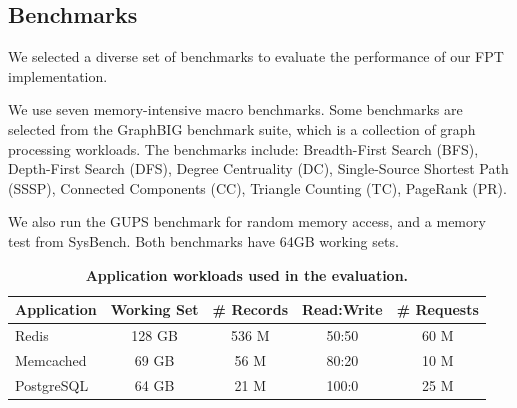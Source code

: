 \subsection{Benchmarks}

We selected a diverse set of benchmarks to evaluate the performance of our FPT implementation.

We use seven memory-intensive macro benchmarks. Some benchmarks are selected from the GraphBIG benchmark suite, which is a collection of graph processing workloads. The benchmarks include: 
    Breadth-First Search (BFS),
    Depth-First Search (DFS),
    Degree Centruality (DC),
    Single-Source Shortest Path (SSSP),
    Connected Components (CC),
    Triangle Counting (TC),
    PageRank (PR).

We also run the GUPS benchmark for random memory access, and a memory test from SysBench. Both benchmarks have 64GB working sets.

\begin{table}
    \centering
    \footnotesize
    \setlength{\tabcolsep}{2pt}
    \begin{tabular}{lcccc}
        \toprule
        \textbf{Application} & \textbf{Working Set} & {\bf \# Records} & \textbf{Read:Write} & {\bf \# Requests} \\
        \midrule
        Redis      & 128 GB & 536 M & 50:50 & 60 M \\
        Memcached  & 69 GB  & 56 M  & 80:20 &  10 M \\
        PostgreSQL & 64 GB  & 21 M & 100:0 & 25 M \\
        \bottomrule
    \end{tabular}
    \caption{\bf Application workloads used in the evaluation.}
    \label{table:workloads}
\end{table}

